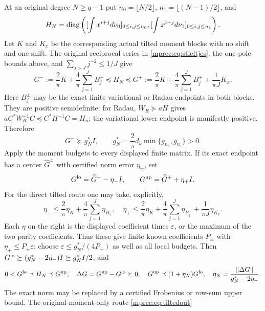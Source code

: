 \documentclass[11pt]{article}
\begin{document}
At an original degree $N\ge q-1$ put
$n_0=\lfloor N/2\rfloor$, $n_1=\lfloor(N-1)/2\rfloor$, and
\[
 H_N=\operatorname{diag}\left([\int x^{i+j}d\nu_0]_{0\le i,j\le n_0},
                [\int x^{i+j}d\nu_1]_{0\le i,j\le n_1}\right).
\]
Let $K$ and $K_x$ be the corresponding actual tilted moment
blocks with no shift and one shift. The original reciprocal series
in \eqref{mprec:eq:stieltjes}, the one-pole bounds above, and
$\sum_{j>J}j^{-2}\le1/J$ give
\begin{equation}\label{mprec:eq:Gexact}
 G^-:=\frac2\pi K+\frac4\pi\sum_{j=1}^JB_j^-
 \preceq H_N\preceq
 G^+:=\frac2\pi K+\frac4\pi\sum_{j=1}^JB_j^+
                        +\frac1{\pi J}K_x.
\end{equation}
Here $B_j^\pm$ may be the exact finite variational or Radau
endpoints in both blocks. They are positive semidefinite: for
Radau, $W_R\succeq aH$ gives
$aC^*W_R^{-1}C\preceq C^*H^{-1}C=H_n$; the variational
lower endpoint is manifestly positive. Therefore
\begin{equation}\label{mprec:eq:gsource}
 G^-\succeq g_N^*I,\qquad
 g_N^*=\frac2\pi d_{\widetilde\nu}
                         \min\{g_{n_0},g_{n_1}\}>0.
\end{equation}
Apply the moment budgets to every displayed finite matrix. If
its exact endpoint has a center $\widehat G^\pm$ with certified
norm error $\eta_\pm$, set
\begin{equation}\label{mprec:eq:Gout}
 G^{\rm lo}=\widehat G^--\eta_-I,\qquad
 G^{\rm up}=\widehat G^++\eta_+I.
\end{equation}
For the direct tilted route one may take, explicitly,
\[
 \eta_-\le\frac2\pi\eta_K+\frac4\pi\sum_{j=1}^J\eta_{B_j^-},
 \quad
 \eta_+\le\frac2\pi\eta_K+\frac4\pi\sum_{j=1}^J\eta_{B_j^+}
                         +\frac1{\pi J}\eta_{K_x}.
\]
Each $\eta$ on the right is the displayed coefficient times
$\varepsilon$, or the maximum of the two parity coefficients.
Thus these give finite known coefficients $P_\pm$ with
$\eta_\pm\le P_\pm\varepsilon$; choose
$\varepsilon\le g_N^*/(4P_-)$ as well as all local budgets.
Then $G^{\rm lo}\succeq(g_N^*-2\eta_-)I\succeq g_N^*I/2$,
and
\begin{equation}\label{mprec:eq:sourcecert}
 0<G^{\rm lo}\preceq H_N\preceq G^{\rm up},\quad
 \Delta G=G^{\rm up}-G^{\rm lo}\succeq0,\quad
 G^{\rm up}\preceq(1+\eta_N)G^{\rm lo},\quad
 \eta_N=\frac{\left\lVert\Delta G\right\rVert}{g_N^*-2\eta_-}.
\end{equation}
The exact norm may be replaced by a certified Frobenius or row-sum
upper bound. The original-moment-only route \eqref{mprec:eq:tiltedout}
\end{document}
